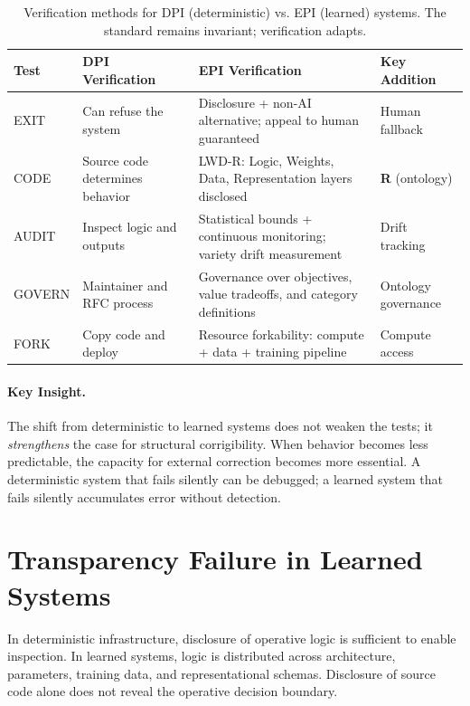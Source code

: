 \documentclass[11pt,a4paper]{article}
\theoremstyle{definition}
\begin{document}
\begin{table}[htbp]
\centering
\small
\begin{tabular}{@{}lp{3.5cm}p{4.5cm}p{3cm}@{}}
\toprule
\textbf{Test} & \textbf{DPI Verification} & \textbf{EPI Verification} & \textbf{Key Addition} \\
\midrule
EXIT & Can refuse the system & Disclosure + non-AI alternative; appeal to human guaranteed & Human fallback \\
CODE & Source code determines behavior & LWD-R: Logic, Weights, Data, Representation layers disclosed & \textbf{R} (ontology) \\
AUDIT & Inspect logic and outputs & Statistical bounds + continuous monitoring; variety drift measurement & Drift tracking \\
GOVERN & Maintainer and RFC process & Governance over objectives, value tradeoffs, and category definitions & Ontology governance \\
FORK & Copy code and deploy & Resource forkability: compute + data + training pipeline & Compute access \\
\bottomrule
\end{tabular}
\caption{Verification methods for DPI (deterministic) vs. EPI (learned) systems. The standard remains invariant; verification adapts.}
\label{tab:verification}
\end{table}

\paragraph{Key Insight.} The shift from deterministic to learned systems does not weaken the tests; it \textit{strengthens} the case for structural corrigibility. When behavior becomes less predictable, the capacity for external correction becomes more essential. A deterministic system that fails silently can be debugged; a learned system that fails silently accumulates error without detection.


\section{Transparency Failure in Learned Systems}
\label{sec:code-ai}

In deterministic infrastructure, disclosure of operative logic is sufficient to enable inspection. In learned systems, logic is distributed across architecture, parameters, training data, and representational schemas. Disclosure of source code alone does not reveal the operative decision boundary.
\end{document}
